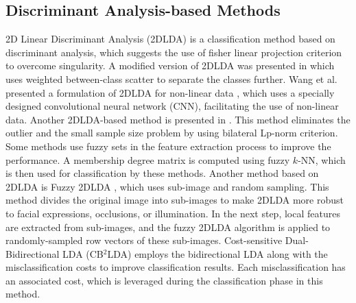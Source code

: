 \subsection{Discriminant Analysis-based Methods}
\label{subs:Lit_2D_DA}
2D Linear Discriminant Analysis (2DLDA) \cite{LiY05} is a classification method based on discriminant analysis, which suggests the use of fisher linear projection criterion to overcome singularity. A modified version of 2DLDA was presented in \cite{ZhiR08} which uses weighted between-class scatter to separate the classes further. Wang et al. presented a formulation of 2DLDA for non-linear data \cite{WangQNY17}, which uses a specially designed convolutional neural network (CNN), facilitating the use of non-linear data. Another 2DLDA-based method is presented in \cite{LiSWD19}. This method eliminates the outlier and the small sample size problem by using bilateral Lp-norm criterion. Some methods \cite{YangYZS10,WanYGY17} use fuzzy sets in the feature extraction process to improve the performance. A membership degree matrix is computed using fuzzy $k$-NN, which is then used for classification by these methods. Another method based on 2DLDA is Fuzzy 2DLDA \cite{ZhangZC20}, which uses sub-image and random sampling. This method divides the original image into sub-images to make 2DLDA more robust to facial expressions, occlusions, or illumination. In the next step, local features are extracted from sub-images, and the fuzzy 2DLDA algorithm is applied to randomly-sampled row vectors of these sub-images. Cost-sensitive Dual-Bidirectional LDA (CB$^2$LDA) \cite{LiZHZ20} employs the bidirectional LDA along with the misclassification costs to improve classification results. Each misclassification has an associated cost, which is leveraged during the classification phase in this method.


